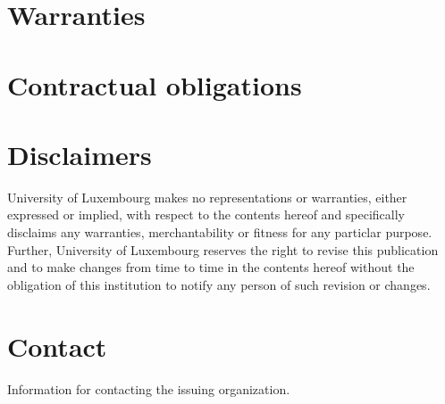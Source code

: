 \section{Warranties}

\section{Contractual obligations}

\section{Disclaimers}
University of Luxembourg makes no representations or warranties, either
expressed or implied, with respect to the contents hereof and specifically
disclaims any warranties, merchantability or fitness for any particlar purpose.
Further, University of Luxembourg reserves the right to revise this publication
and to make changes from time to time in the contents hereof without the
obligation of this institution to notify any person of such revision or changes.

\section{Contact}
Information for contacting the issuing organization.

